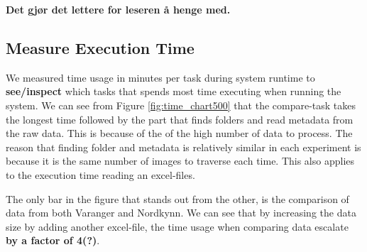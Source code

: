 \documentclass[USenglish]{uit-thesis}
\begin{document}
\textbf{Det gjør det lettere for leseren å henge med.}
\fi

\subsection{Measure Execution Time}

We measured time usage in minutes per task during system runtime to \textbf{see/inspect} which tasks that spends most time executing when running the system. We can see from Figure \ref{fig:time_chart500} that the compare-task takes the longest time followed by the part that finds folders and read metadata from the raw data. This is because of the of the high number of data to process. The reason that finding folder and metadata is relatively similar in each experiment is because it is the same number of images to traverse each time. This also applies to the execution time reading an excel-files.



The only bar in the figure that stands out from the other, is the comparison of data from both Varanger and Nordkynn. We can see that by increasing the data size by adding another excel-file, the time usage when comparing data escalate \textbf{by a factor of 4(?)}.


\end{document}
